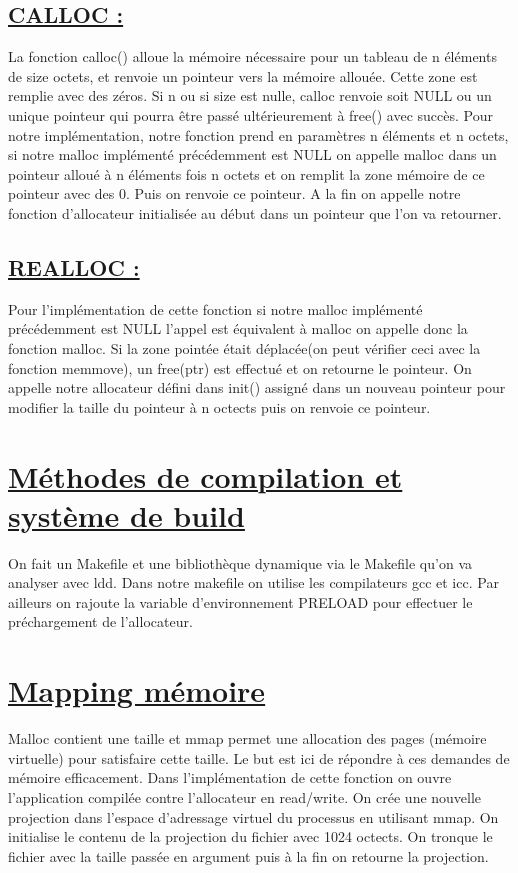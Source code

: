\documentclass[12pt]{article}
\begin{document}
\subsection{\underline{CALLOC :}}
\begin{Large}
La fonction calloc() alloue la mémoire nécessaire pour un tableau de
n éléments de size octets, et renvoie un pointeur vers  la  mémoire allouée. Cette zone est remplie avec des zéros. Si n ou si size est nulle, calloc renvoie soit NULL ou un unique pointeur qui pourra être passé ultérieurement à free() avec succès. Pour notre implémentation, notre fonction prend en paramètres n éléments et n octets, si notre malloc implémenté précédemment est NULL on appelle malloc dans un pointeur alloué à n éléments fois n octets et on remplit la zone mémoire de ce pointeur avec des 0. Puis on renvoie ce pointeur. A la fin on appelle notre fonction d'allocateur initialisée au début dans un pointeur que l'on va retourner.
\end{Large}

\subsection{\underline{REALLOC :}}
{\Large Pour l'implémentation de cette fonction si notre malloc implémenté précédemment est NULL l'appel est équivalent à malloc on appelle donc la fonction malloc. Si la zone pointée était déplacée(on peut vérifier ceci avec la fonction memmove), un free(ptr) est effectué et on retourne le pointeur. On appelle notre allocateur défini dans init() assigné dans un nouveau pointeur pour modifier la taille du pointeur à n octects puis on renvoie ce pointeur.}

\section{ \underline{Méthodes de compilation et système de build}}
{\Large On fait un Makefile et une bibliothèque dynamique via le Makefile qu'on va analyser avec ldd. Dans notre makefile on utilise les compilateurs gcc et icc. Par ailleurs on rajoute la variable d'environnement PRELOAD pour effectuer le préchargement de l'allocateur.}

\section{\underline{Mapping mémoire}}
{\Large Malloc contient une taille et mmap permet une allocation des pages (mémoire virtuelle) pour satisfaire cette taille. Le but est ici de répondre à ces demandes de mémoire efficacement. Dans l'implémentation de cette fonction on ouvre l'application compilée contre l'allocateur en read/write. On crée une nouvelle projection dans l'espace d'adressage virtuel du processus en utilisant mmap. On initialise le contenu de la projection du fichier avec 1024 octects. On tronque le fichier avec la taille passée en argument puis à la fin on retourne la projection.}
\end{document}
